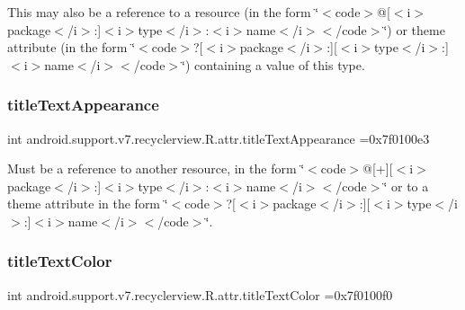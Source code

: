 This may also be a reference to a resource (in the form \char`\"{}$<$code$>$@\mbox{[}$<$i$>$package$<$/i$>$\+:\mbox{]}$<$i$>$type$<$/i$>$\+:$<$i$>$name$<$/i$>$$<$/code$>$\char`\"{}) or theme attribute (in the form \char`\"{}$<$code$>$?\mbox{[}$<$i$>$package$<$/i$>$\+:\mbox{]}\mbox{[}$<$i$>$type$<$/i$>$\+:\mbox{]}$<$i$>$name$<$/i$>$$<$/code$>$\char`\"{}) containing a value of this type. \mbox{\label{classandroid_1_1support_1_1v7_1_1recyclerview_1_1R_1_1attr_a13293aa0f7b4ed66fa67e3a093190bc9}} 
\subsubsection{\texorpdfstring{title\+Text\+Appearance}{titleTextAppearance}}
{\footnotesize\ttfamily int android.\+support.\+v7.\+recyclerview.\+R.\+attr.\+title\+Text\+Appearance =0x7f0100e3\hspace{0.3cm}{\ttfamily [static]}}

Must be a reference to another resource, in the form \char`\"{}$<$code$>$@\mbox{[}+\mbox{]}\mbox{[}$<$i$>$package$<$/i$>$\+:\mbox{]}$<$i$>$type$<$/i$>$\+:$<$i$>$name$<$/i$>$$<$/code$>$\char`\"{} or to a theme attribute in the form \char`\"{}$<$code$>$?\mbox{[}$<$i$>$package$<$/i$>$\+:\mbox{]}\mbox{[}$<$i$>$type$<$/i$>$\+:\mbox{]}$<$i$>$name$<$/i$>$$<$/code$>$\char`\"{}. \mbox{\label{classandroid_1_1support_1_1v7_1_1recyclerview_1_1R_1_1attr_ac6636a11b2af03de8fd840d96dea70df}} 
\subsubsection{\texorpdfstring{title\+Text\+Color}{titleTextColor}}
{\footnotesize\ttfamily int android.\+support.\+v7.\+recyclerview.\+R.\+attr.\+title\+Text\+Color =0x7f0100f0\hspace{0.3cm}{\ttfamily [static]}}

